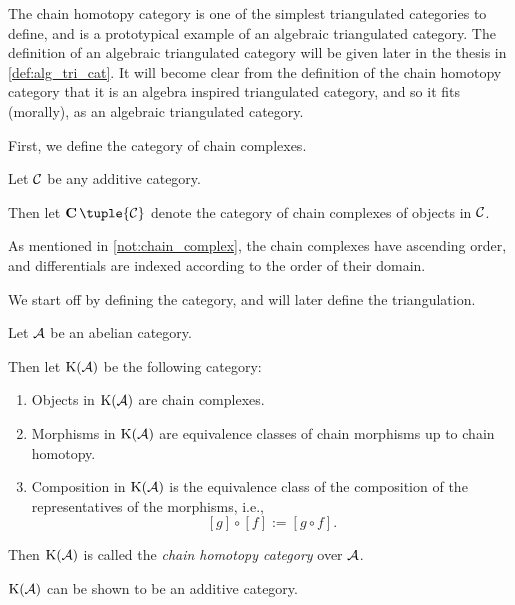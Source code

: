 The chain homotopy category is one of the simplest triangulated categories to define, and is a prototypical example of an algebraic triangulated category. The definition of an algebraic triangulated category will be given later in the thesis in \autoref{def:alg_tri_cat}. It will become clear from the definition of the chain homotopy category that it is an algebra inspired triangulated category, and so it fits (morally), as an algebraic triangulated category.

First, we define the category of chain complexes.

\begin{definition}
    \label{def:chain_complex}
    Let \( {\mathcal{C}} \) be any additive category.
    
    Then let \( \C \tuple{\Cc} \) denote the category of chain complexes of objects in \( {\mathcal{C}} \).

    As mentioned in \autoref{not:chain_complex}, the chain complexes have ascending order, and differentials are indexed according to the order of their domain.
\end{definition}

We start off by defining the category, and will later define the triangulation.

\begin{definition}
    \label{def:chain_homotopy_cat}
    Let \( {\mathcal{A}} \) be an abelian category.

    Then let \( \operatorname{K}({\mathcal{A}}) \) be the following category:
    \begin{enumerate}
        \item {
            Objects in \( \operatorname{K}({\mathcal{A}}) \) are chain complexes.
        }
        \item {
            Morphisms in \( \operatorname{K}({\mathcal{A}}) \) are equivalence classes of chain morphisms up to chain homotopy.
        }
        \item {
            Composition in \( \operatorname{K}({\mathcal{A}}) \) is the equivalence class of the composition of the representatives of the morphisms, i.e.,
            \[
                [g] \circ [f] := [g \circ f ].
            \]
        }
    \end{enumerate}

    Then \( \operatorname{K}({\mathcal{A}}) \) is called the \emph{chain homotopy category} over \( {\mathcal{A}} \).
\end{definition}

\( \operatorname{K}({\mathcal{A}}) \) can be shown to be an additive category.


